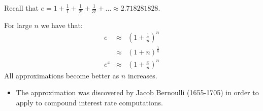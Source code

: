 \begin{frame}
Recall that $e=1+\frac{1}{1}+\frac{1}{2!}+\frac{1}{3!}+\dots\approx 2.718281828$.
\begin{theorem}
For large $n$ we have that:
\[
\begin{array}{rcl}
e &\approx& \displaystyle  \left(1+\frac{1}{n}\right)^n\\
&\approx&\displaystyle (1 + n)^{\frac{1}{n}} \\
e^x&\approx&\displaystyle  \left(1+\frac{x}{n}\right)^n
\end{array}
\]
All approximations become better as $n$ increases.
\end{theorem}
\begin{itemize}
\item The approximation was discovered by Jacob Bernoulli (1655-1705) in order to apply to compound interest rate computations.
\end{itemize}
\end{frame}
